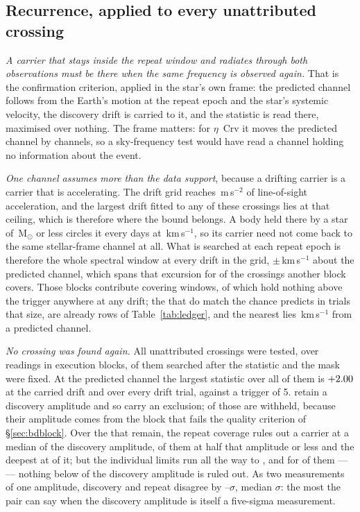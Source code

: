 \subsection{Recurrence, applied to every unattributed crossing}
\label{sec:etacrv}

\emph{A carrier that stays inside the repeat window and radiates through both
observations must be there when the same frequency is observed again.} That is
the confirmation criterion, applied in the star's own frame: the predicted
channel follows from the Earth's motion at the repeat epoch and the star's
systemic velocity, the discovery drift is carried to it, and the statistic is
read there, maximised over nothing. The frame matters: for $\eta$~Crv it moves
the predicted channel by \VnEcrDchan{} channels, so a sky-frequency test would
have read a channel holding no information about the event.

\emph{One channel assumes more than the data support}, because a drifting
carrier is a carrier that is accelerating. The drift grid reaches
\WdAGrid\,m\,s$^{-2}$ of line-of-sight acceleration, and the largest drift
fitted to any of these crossings lies at that ceiling, which is therefore
where the bound belongs. A body held there by a star of \WdMassMax\,M$_\odot$
or less circles it every \WdOrbDay{} days at \WdOrbKms\,km\,s$^{-1}$, so its
carrier
need not come back to the same stellar-frame channel at all. What is searched
at each repeat epoch is therefore the whole spectral window at every drift in
the grid, $\pm$\WdHalfKms\,km\,s$^{-1}$ about the predicted channel, which
spans that excursion for \WdNOrbSpan{} of the \WdNOrbTot{} crossings another
block covers. Those blocks contribute \WdNCov{} covering windows, of which
\WdNEmpty{} hold nothing above the trigger anywhere at any drift; the
\WdNExc{} that do match the \WdExpect{} chance predicts in trials that
size, are already rows of Table~\ref{tab:ledger}, and the nearest lies
\WdNearKms\,km\,s$^{-1}$ from a predicted channel.

\emph{No crossing was found again.} All \RcNTested{} unattributed crossings were
tested, over \RcNRepeatMeas{} readings in \RcNRepeatBlock{} execution blocks,
\RcNRepeatFollow{} of them searched after the statistic and the mask were
fixed. At the predicted channel the largest statistic over all
of them is $+2.00$ at the carried drift and \RcTMax{} over every drift
trial, against a trigger of 5. \RcNExclPoss{} retain a discovery amplitude and
so carry an exclusion; \RcNWithheld{} of those are withheld, because their
amplitude comes from the block that fails the quality criterion of
\S\ref{sec:bdblock}. Over the \RcNExcl{} that remain, the
repeat coverage rules out a carrier at a median \RcFracMed{} of the discovery
amplitude, \RcNFracHalf{} of them at half that amplitude or less and the
deepest at \RcFracMin{} of it; but the individual limits run all the way to
\RcFracMax, and for \RcNFracWeak{} of them --- \RcFracWeakList{} --- nothing
below \RcFracWeakLo{} of the discovery amplitude is ruled out. As two
measurements of one amplitude, discovery and repeat disagree by
\RcExclMin--\RcExclMax$\sigma$, median \RcExclMed$\sigma$: the most the pair
can say when the discovery amplitude is itself a five-sigma measurement.

